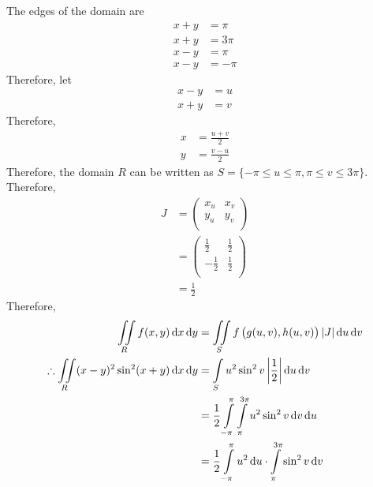 \documentclass[fleqn, a4paper, 12pt, twoside]{article}
\theoremstyle{definition}
\theoremstyle{theorem}
\begin{document}
{\begin{solution}
	The edges of the domain are
	\begin{align*}
		x + y & = \pi   \\
		x + y & = 3 \pi \\
		x - y & = \pi   \\
		x - y & = -\pi
	\end{align*}
	Therefore, let
	\begin{align*}
		x - y & = u \\
		x + y & = v
	\end{align*}
	Therefore,
	\begin{align*}
		x & = \frac{u + v}{2} \\
		y & = \frac{v - u}{2}
	\end{align*}
	Therefore, the domain $R$ can be written as $S = \{-\pi \le u \le \pi, \pi \le v \le 3 \pi\}$.\\
	Therefore,
	\begin{align*}
		J &=
			\begin{pmatrix}
				x_u & x_v \\
				y_u & y_v \\
			\end{pmatrix}\\
		  &=
			\begin{pmatrix}
				\frac{1}{2}  & \frac{1}{2} \\
				-\frac{1}{2} & \frac{1}{2} \\
			\end{pmatrix}\\
		  &= \frac{1}{2}
	\end{align*}
	Therefore,
	\begin{align*}
		\iint\limits_{R} f(x,y) \dif x \dif y                              & = \iint\limits_{S} f\left( g(u,v), h(u,v) \right) |J| \dif u \dif v                                                   \\
		\therefore \iint\limits_{R} (x - y)^2 \sin^2 (x + y) \dif x \dif y & = \int\limits_{S} u^2 \sin^2 v \left| \frac{1}{2} \right| \dif u \dif v                                               \\
                                                                                   & = \frac{1}{2} \int\limits_{-\pi}^{\pi} \int\limits_{\pi}^{3 \pi} u^2 \sin^2 v \dif v \dif u                           \\
                                                                                   & = \frac{1}{2} \int\limits_{-\pi}^{\pi} u^2 \dif u \cdot \int\limits_{\pi}^{3 \pi} \sin^2 v \dif v                     \\

\end{align*}
\end{solution}}
\end{document}
